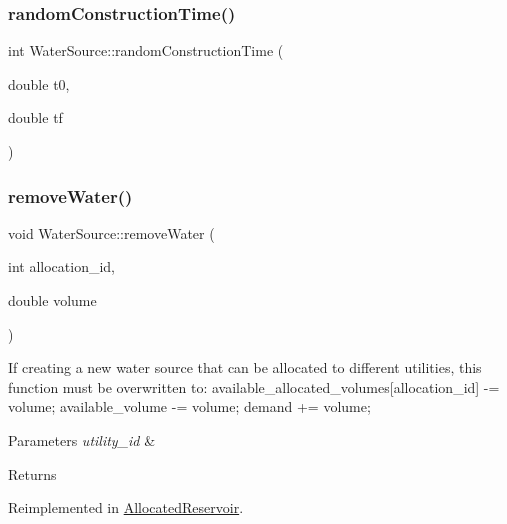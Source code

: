 \subsubsection{\texorpdfstring{random\+Construction\+Time()}{randomConstructionTime()}}
{\footnotesize\ttfamily int Water\+Source\+::random\+Construction\+Time (\begin{DoxyParamCaption}\item[{double}]{t0,  }\item[{double}]{tf }\end{DoxyParamCaption})}

\mbox{\label{classWaterSource_ab697c3a0765d445f72533f6a5f139bd9_ab697c3a0765d445f72533f6a5f139bd9}} 
\subsubsection{\texorpdfstring{remove\+Water()}{removeWater()}}
{\footnotesize\ttfamily void Water\+Source\+::remove\+Water (\begin{DoxyParamCaption}\item[{int}]{allocation\+\_\+id,  }\item[{double}]{volume }\end{DoxyParamCaption})\hspace{0.3cm}{\ttfamily [virtual]}}

If creating a new water source that can be allocated to different utilities, this function must be overwritten to\+: available\+\_\+allocated\+\_\+volumes\mbox{[}allocation\+\_\+id\mbox{]} -\/= volume; available\+\_\+volume -\/= volume; demand += volume; 
\begin{DoxyParams}{Parameters}
{\em utility\+\_\+id} & \\
\hline
\end{DoxyParams}
\begin{DoxyReturn}{Returns}

\end{DoxyReturn}


Reimplemented in \mbox{\hyperlink{classAllocatedReservoir_a3a9b7ce2e1d42cc373095cfd40ef2ae2_a3a9b7ce2e1d42cc373095cfd40ef2ae2}{Allocated\+Reservoir}}.

\mbox{\label{classWaterSource_af52f39412f0d761f7e3b3369ffdf90f1_af52f39412f0d761f7e3b3369ffdf90f1}} 
